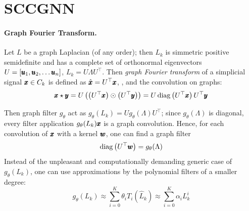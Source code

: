 \documentclass{mynotes}
\begin{document}
\section{ SCCGNN }

\paragraph{Graph Fourier Transform. }

Let \( L \) be a graph Laplacian (of any order); then \( L_k \) is simmetric positive semidefinite and has a complete set of orthonormal eigenvectors \( U = [ \pmb{u}_1, \pmb{u}_2, \ldots \pmb{u}_n ]\), \( L_k = U \Lambda U^\top \). Then \emph{graph Fourier transform } of a simplicial signal \( \pmb{x} \in C_k \) is defined as \( \hat{ \pmb{x} } = U^\top \pmb{x} \), \cite{kipfSemiSupervisedClassificationGraph2017}, and the convolution on graphs:
\begin{equation}
      \pmb{x} \star \pmb{y} = U \left(  \left( U^\top \pmb{x} \right)  \odot \left( U^\top \pmb{y} \right) \right) = U \operatorname{diag} \left( U^\top \pmb{x} \right) U^\top \pmb{y}
\end{equation}

Then graph filter \( g_\theta \) act as \( g_\theta ( L_k ) = U g_\theta ( \Lambda ) U^\top \); since \( g_\theta ( \Lambda ) \) is diagonal, every filter application \( g_\theta (L_k) \pmb{x} \) is a graph convolution. Hence, for each convolution of \( \pmb{x} \) with a kernel \( \pmb{w} \), one can find a graph filter
\begin{equation}
      \operatorname{diag} \left( U^\top \pmb{w} \right) = g_\theta ( \Lambda )
\end{equation}
Instead of the unpleasant and computationally demanding generic case of \( g_\theta (L_k) \), one can use approximations by the polynomial filters of a smaller degree:
\begin{equation}
      g_\theta (L_k ) \approx \sum_{i=0}^K \theta_i T_i ( \hat L_k ) \approx   \sum_{i=0}^K \alpha_i L_k^i
\end{equation}
\end{document}
